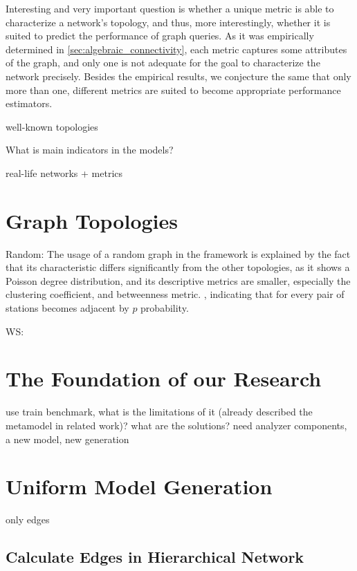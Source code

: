 Interesting and very important question is whether a unique metric is able to characterize a network's topology, and thus, more interestingly, whether it is suited to predict the performance of graph queries. As it was empirically determined in \ref{sec:algebraic_connectivity}, each metric captures some attributes of the graph, and only one is not adequate for the goal to characterize the network precisely. Besides the empirical results, we conjecture the same that only more than one, different metrics are suited to become appropriate performance estimators.


well-known topologies

What is main indicators in the models?

real-life networks + metrics
\section{Graph Topologies}

Random:
	The usage of a random graph in the framework is explained by the fact that its characteristic differs significantly from the other topologies, as it shows a Poisson degree distribution, and its descriptive metrics are smaller, especially the clustering coefficient, and betweenness metric. , indicating that for every pair of stations becomes adjacent by $p$ probability. 
	
WS:

	

\section{The Foundation of our Research}
use train benchmark, what is the limitations of it (already described the metamodel in related work)? what are the solutions? need analyzer components, a new model, new generation


\section{Uniform Model Generation}
only edges
\subsection{Calculate Edges in Hierarchical Network}

